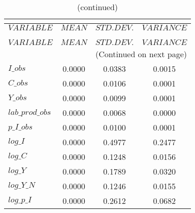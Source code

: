  
\begin{center}
\begin{longtable}{lccc} 
\caption{THEORETICAL MOMENTS}\\
 \label{Table:th_moments}\\
\toprule 
$VARIABLE        $	 & 	 $         MEAN$	 & 	 $    STD. DEV.$	 & 	 $     VARIANCE$\\
\midrule \endfirsthead 
\caption{(continued)}\\
 \toprule \\ 
$VARIABLE        $	 & 	 $         MEAN$	 & 	 $    STD. DEV.$	 & 	 $     VARIANCE$\\
\midrule \endhead 
\midrule \multicolumn{4}{r}{(Continued on next page)} \\ \bottomrule \endfoot 
\bottomrule \endlastfoot 
$I\_obs          $	 & 	       0.0000	 & 	       0.0383	 & 	       0.0015 \\ 
$C\_obs          $	 & 	       0.0000	 & 	       0.0106	 & 	       0.0001 \\ 
$Y\_obs          $	 & 	       0.0000	 & 	       0.0099	 & 	       0.0001 \\ 
$lab\_prod\_obs  $	 & 	       0.0000	 & 	       0.0068	 & 	       0.0000 \\ 
$p\_I\_obs       $	 & 	       0.0000	 & 	       0.0100	 & 	       0.0001 \\ 
$log\_I          $	 & 	       0.0000	 & 	       0.4977	 & 	       0.2477 \\ 
$log\_C          $	 & 	       0.0000	 & 	       0.1248	 & 	       0.0156 \\ 
$log\_Y          $	 & 	       0.0000	 & 	       0.1789	 & 	       0.0320 \\ 
$log\_Y\_N       $	 & 	       0.0000	 & 	       0.1246	 & 	       0.0155 \\ 
$log\_p\_I       $	 & 	       0.0000	 & 	       0.2612	 & 	       0.0682 \\ 
\end{longtable}
 \end{center}
